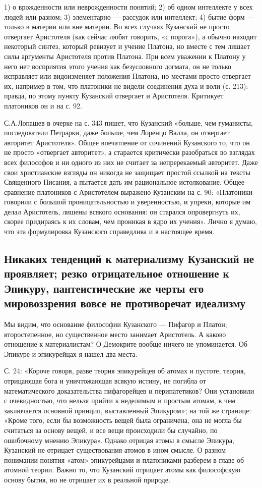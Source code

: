 1) о врожденности или неврожденности понятий; 2) об одном интеллекте у
всех людей или разном; 3) элементарно --- рассудок или интеллект; 4)
бытие форм --- только в материи или вне материи. Во всех случаях
Кузанский не просто отвергает Аристотеля (как сейчас любят говорить,
«с порога»), а обычно находит некоторый синтез, который ревизует и
учение Платона, но вместе с тем лишает силы аргументы Аристотеля
против Платона. При всем уважении к Платону у него нет восприятия
этого учения как безусловного догмата, он не только исправляет или
видоизменяет положения Платона, но местами просто отвергает их,
например в том, что платоники не видели соединения духа и воли (с.
213): правда, по этому пункту Кузанский отвергает и Аристотеля.
Критикует платоников он и на с. 92.

С.А.Лопашев в очерке на с. 343 пишет, что Кузанский «больше, чем
гуманисты, последователи Петрарки, даже больше, чем Лоренцо
Валла, он отвергает авторитет Аристотеля». Общее впечатление от
сочинений Кузанского то, что он не просто «отвергает авторитет», а
старается критически разобраться во взглядах всех философов и ни
одного из них не считает за непререкаемый авторитет. Даже свои
христианские взгляды он никогда не защищает простой ссылкой на тексты
Священного Писания, а пытается дать им рациональное истолкование.
Общее сравнение платоников с Аристотелем выражено Кузанским на с. 90:
«Платоники говорили с большой проницательностью и уверенностью, и
упреки, которые им делал Аристотель, лишены всякого основания: он
старался опровергнуть их, скорее придираясь к их словам, чем проникая
в ядро их учения». Лично я думаю, что эта формулировка Кузанского
справедлива и в настоящее время.

\subsection{Никаких тенденций к материализму Кузанский не проявляет;
резко отрицательное отношение к Эпикуру, пантеистические же
черты его мировоззрения вовсе не противоречат идеализму}

Мы видим, что основание философии Кузанского --- Пифагор и Платон;
второстепенное, но существенное место занимает Аристотель. А каково
отношение к материалистам? О Демокрите вообще ничего не упоминается.
Об Эпикуре и эпикурейцах я нашел два места.

С. 24: «Короче говоря, разве теория эпикурейцев об атомах и пустоте,
теория, отрицающая бога и уничтожающая всякую истину, не погибла от
математического доказательства пифагорейцев и перипатетиков? Они
установили с очевидностью, что нельзя прийти к неделимым и простым
атомам, в чем заключается основной принцип, выставленный Эпикуром»; на
той же странице: «Кроме того, если бы возможность вещей была
ограничена, она не могла бы считаться за основу вещей, и все вещи
происходили бы случайно, по ошибочному мнению Эпикура». Однако отрицая
атомы в смысле Эпикура, Кузанский не отрицает существования атомов в
ином смысле. О разном понимании понятия «атом» эпикурейцами и
платониками разберем в главе об атомной теории. Важно то, что
Кузанский отрицает атомы как философскую основу бытия, но не отрицает
их в реальной природе.

